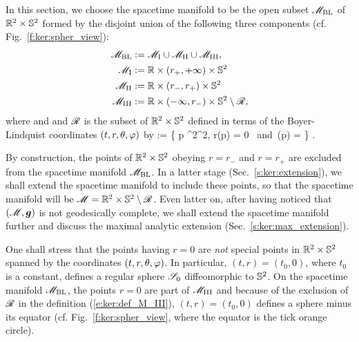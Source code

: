 In this section, we choose the spacetime manifold to be the open subset $\mathscr{M}_{\rm BL}$
of $\mathbb{R}^2\times\mathbb{S}^2$ formed by the disjoint union of
the following three components (cf. Fig.~\ref{f:ker:spher_view}):
\begin{subequations}
\begin{align}
    \mathscr{M}_{\rm BL} & :=  \mathscr{M}_{\rm I} \cup \mathscr{M}_{\rm II} \cup \mathscr{M}_{\rm III} , \label{e:ker:def_M_BL} \\
    \mathscr{M}_{\rm I} & :=  \mathbb{R}\times(r_+,+\infty)\times\mathbb{S}^2 \label{e:ker:def_M_I}\\
    \mathscr{M}_{\rm II} & :=  \mathbb{R}\times(r_-,r_+)\times\mathbb{S}^2 \\
    \mathscr{M}_{\rm III} & :=  \mathbb{R}\times(-\infty,r_-)\times\mathbb{S}^2 \setminus \mathscr{R}, \label{e:ker:def_M_III}
\end{align}
\end{subequations}
where
\be \label{e:ker:def_r_pm}
     \quad\mbox{and}\quad  {}
\ee
and $\mathscr{R}$ is the subset of $\mathbb{R}^2\times\mathbb{S}^2$ defined in terms of the Boyer-Lindquist coordinates $(t,r,\theta,\varphi)$ by
\be \label{e:ker:def_ring}
    \ring := \left\{ p \in \R^2\times\SS^2,
        \quad r(p) = 0 \ \mbox{and}\ \th(p) =  \right\} .
\ee
\begin{remark}
By construction, the points of $\mathbb{R}^2\times\mathbb{S}^2$ obeying $r=r_-$ and $r=r_+$ are
excluded from the spacetime manifold $\mathscr{M}_{\rm BL}$. In a latter stage
(Sec.~\ref{s:ker:extension}), we shall extend the spacetime manifold to
include these points, so that the spacetime manifold will be $\mathscr{M} = \mathbb{R}^2\times\mathbb{S}^2\setminus \mathscr{R}$. Even latter on, after having noticed that $(\mathscr{M},\bm{g})$ is not geodesically complete,
we shall extend the spacetime manifold further and discuss the maximal analytic
extension (Sec.~\ref{s:ker:max_extension}).
\end{remark}

\begin{remark} \label{r:ker:r_zero}
One shall stress that the points having $r=0$ are \emph{not} special points in
$\mathbb{R}^2\times\mathbb{S}^2$ spanned by the coordinates $(t,r,\theta,\varphi)$. In particular,
$(t,r) = (t_0, 0)$, where $t_0$ is a constant, defines a regular sphere
$\mathscr{S}_0$ diffeomorphic to $\mathbb{S}^2$. On the spacetime manifold $\mathscr{M}_{\rm BL}$, the
points $r=0$ are part of $\mathscr{M}_{\rm III}$ and because of the exclusion of $\mathscr{R}$
in the definition (\ref{e:ker:def_M_III}), $(t,r) = (t_0, 0)$ defines
a sphere minus its equator (cf. Fig.~\ref{f:ker:spher_view}, where the equator
is the tick orange circle).
\end{remark}

